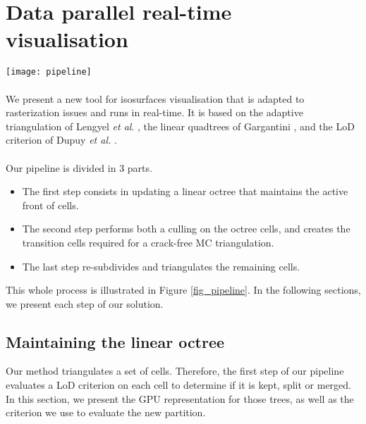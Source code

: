 \section{Data parallel real-time visualisation}

\begin{figure*} [t!]
  \centering
  \texttt{[image: pipeline]}
  \caption{ This figure summarizes our GPU pipeline. Data buffers are represented in green and computations in red. Each computation retrieves data from a buffer and fills a new one. }
  \label{fig_pipeline} 
\end{figure*}

\paragraph{}
We present a new tool for isosurfaces visualisation that is adapted to rasterization issues and runs in real-time.
It is based on the adaptive triangulation of Lengyel \textit{et al}. \cite{lengyel2010voxel}, the linear quadtrees  of Gargantini \cite{gargantini1982effective}, and the LoD criterion of Dupuy \textit{et al.} \cite{dupuy2014quadtrees}.


\paragraph{}
Our pipeline is divided in 3 parts.
\begin{itemize}
\item The first step consists in updating a linear octree that maintains the active front of cells.
\item The second step performs both a culling on the octree cells, and creates the transition cells required for a crack-free MC triangulation.
\item The last step re-subdivides and triangulates the remaining cells.
\end{itemize}
This whole process is illustrated in Figure \ref{fig_pipeline}.
In the following sections, we present each step of our solution.

\subsection{Maintaining the linear octree}

Our method triangulates a set of cells.
Therefore, the first step of our pipeline evaluates a LoD criterion on each cell to determine if it is kept, split or merged.
In this section, we present the GPU representation for those trees, as well as the criterion we use to evaluate the new partition.

